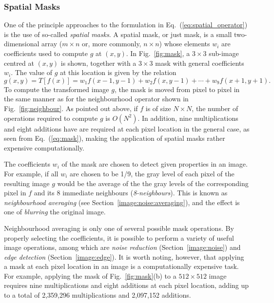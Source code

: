 
\subsubsection{Spatial Masks}
\label{pg:image:spatial:mask}

One of the principle approaches to the formulation in
Eq.~(\ref{eq:spatial_operator}) is the use of so-called {\em spatial
  masks\/}.  A spatial mask, or just mask, is a small two-dimensional
array ($m\times n$ or, more commonly, $n\times n$) whose elements
$w_{i}$ are coefficients used to compute $g$ at $(x,y)$.  In
Fig.~\ref{fig:mask}, a $3\times 3$ sub-image centred at $(x,y)$ is
shown, together with a $3\times 3$ mask with general coefficients
$w_{i}$.  The value of $g$ at this location is given by the relation
\begin{equation}
\label{eq:mask}
g(x,y)=T[f(x)]=w_{1}f(x-1,y-1)+w_{2}f(x,y-1)+\cdots+w_{9}f(x+1,y+1)\mbox{.}
\end{equation}
To compute the transformed image $g$, the mask is moved from pixel to
pixel in the same manner as for the neighbourhood operator shown in
Fig.~\ref{fig:neighbour}.  As pointed out above, if $f$ is of size
$N\times N$, the number of operations required to compute $g$ is
$O(N^{2})$.  In addition, nine multiplications and eight additions
have are required at each pixel location in the general case, as seen
from Eq.~(\ref{eq:mask}), making the application of spatial masks
rather expensive computationally.

The coefficients $w_{i}$ of the mask are chosen to detect given
properties in an image.  For example, if all $w_{i}$ are chosen to be
1/9, the gray level of each pixel of the resulting image $g$ would be
the average of the the gray levels of the corresponding pixel in $f$
and its 8 immediate neighbours ({\em 8-neighbours\/}).  This is known
as {\em neighbourhood averaging\/} (see
Section~\ref{image:noise:averaging}), and the effect is one of {\em
  blurring\/} the original image.

Neighbourhood averaging is only one of several possible mask
operations.  By properly selecting the coefficients, it is possible to
perform a variety of useful image operations, among which are {\em
  noise reduction\/} (Section~\ref{image:noise}) and {\em edge
  detection\/} (Section~\ref{image:edge}).  It is worth noting,
however, that applying a mask at each pixel location in an image is a
computationally expensive task.  For example, applying the mask of
Fig.~\ref{fig:mask}(b) to a $512\times 512$ image requires nine
multiplications and eight additions at each pixel location, adding up
to a total of 2,359,296 multiplications and 2,097,152 additions.
